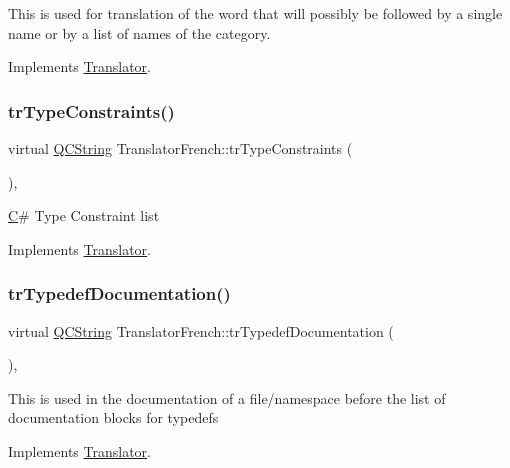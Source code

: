 This is used for translation of the word that will possibly be followed by a single name or by a list of names of the category. 

Implements \mbox{\hyperlink{class_translator}{Translator}}.

\mbox{\label{class_translator_french_ae606c575612d8daf554cf235d75e16d1}} 
\subsubsection{\texorpdfstring{trTypeConstraints()}{trTypeConstraints()}}
{\footnotesize\ttfamily virtual \mbox{\hyperlink{class_q_c_string}{Q\+C\+String}} Translator\+French\+::tr\+Type\+Constraints (\begin{DoxyParamCaption}{ }\end{DoxyParamCaption})\hspace{0.3cm}{\ttfamily [inline]}, {\ttfamily [virtual]}}

\mbox{\hyperlink{class_c}{C}}\# Type Constraint list 

Implements \mbox{\hyperlink{class_translator}{Translator}}.

\mbox{\label{class_translator_french_a2193961addb9cfa67c0eafd787957be1}} 
\subsubsection{\texorpdfstring{trTypedefDocumentation()}{trTypedefDocumentation()}}
{\footnotesize\ttfamily virtual \mbox{\hyperlink{class_q_c_string}{Q\+C\+String}} Translator\+French\+::tr\+Typedef\+Documentation (\begin{DoxyParamCaption}{ }\end{DoxyParamCaption})\hspace{0.3cm}{\ttfamily [inline]}, {\ttfamily [virtual]}}

This is used in the documentation of a file/namespace before the list of documentation blocks for typedefs 

Implements \mbox{\hyperlink{class_translator}{Translator}}.

